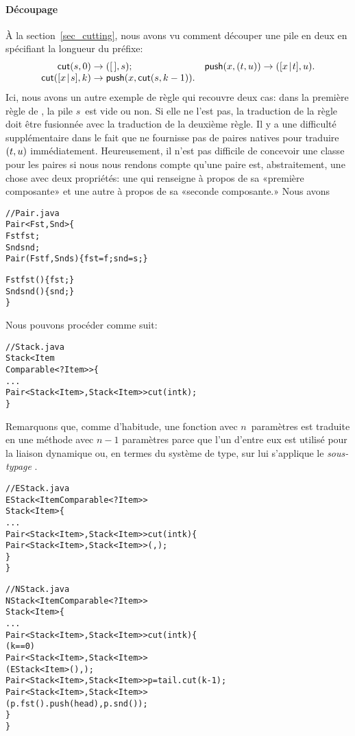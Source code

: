 \paragraph{Découpage}

À la section~\vref{sec_cutting}, nous avons vu comment découper une
pile en deux en spécifiant la longueur du préfixe:
\begin{equation*}
\begin{array}{@{}r@{\;}l@{\;}lr@{\;}l@{\;}l@{}}
\fun{cut}(s,0) & \rightarrow & \pair{\el}{s};
& \fun{push}(x,\pair{t}{u}) & \rightarrow & \pair{\cons{x}{t}}{u}.\\
\fun{cut}(\cons{x}{s},k) & \rightarrow 
& \fun{push}(x,\fun{cut}(s,k-1)).
\end{array}
\end{equation*}
Ici, nous avons un autre exemple de règle qui recouvre deux cas: dans
la première règle de , la pile \(s\)~est vide ou non. Si
elle ne l'est pas, la traduction de la règle doit être fusionnée avec
la traduction de la deuxième règle. Il y a une difficulté
supplémentaire dans le fait que \Java ne fournisse pas de paires
natives pour traduire \(({t},{u})\) immédiatement. Heureusement, il
n'est pas difficile de concevoir une classe pour les paires si nous
nous rendons compte qu'une paire est, abstraitement, une chose avec
deux propriétés: une qui renseigne à propos de sa «première
composante» et une autre à propos de sa «seconde composante.» Nous
avons
\begin{alltt}
// Pair.java
\public \class Pair<Fst,Snd> \{
  \protectedX \final Fst fst;
  \protectedX \final Snd snd;
  \public Pair(\final Fst f, \final Snd s) \{fst = f; snd = s;\}

  \public Fst fst() \{ \return fst; \}
  \public Snd snd() \{ \return snd; \}
\}
\end{alltt}
Nous pouvons procéder comme suit:
\begin{alltt}
// Stack.java
\public \abstractX \class Stack<Item
\hfill\extends Comparable<? \super Item>> \{
  ...
  \public \abstractX
            Pair<Stack<Item>,Stack<Item>> cut(\final int k);
\}
\end{alltt}
Remarquons que, comme d'habitude, une fonction avec \(n\)~paramètres
est traduite en une méthode avec \(n-1\) paramètres parce que l'un
d'entre eux est utilisé pour la liaison dynamique ou, en termes du
système de type, sur lui s'applique le \emph{sous-typage}
\citep{Pierce_2002}.
\begin{alltt}
// EStack.java
\public \class EStack<Item \extends Comparable<? \super Item>> 
       \extends Stack<Item> \{
  ...
  \public Pair<Stack<Item>,Stack<Item>> cut(\final int k) \{
    \return \new Pair<Stack<Item>,Stack<Item>>(\this,\this);
  \}
\}

// NStack.java
\public \class NStack<Item \extends Comparable<? \super Item>>
       \extends Stack<Item> \{
  ...
  \public Pair<Stack<Item>,Stack<Item>> cut(\final int k) \{
    \ifX (k == 0)
       \return \new Pair<Stack<Item>,Stack<Item>>
                      (\new EStack<Item>(),\this);
    Pair<Stack<Item>,Stack<Item>> p = tail.cut(k-1);
    \return \new Pair<Stack<Item>,Stack<Item>>
                   (p.fst().push(head),p.snd());
  \}
\}
\end{alltt}
